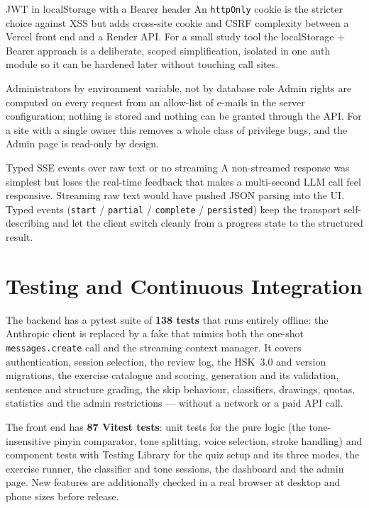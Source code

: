 \documentclass[11pt,a4paper]{article}
\begin{document}
\begin{decision}{JWT in localStorage with a Bearer header}
An \texttt{httpOnly} cookie is the stricter choice against XSS but adds
cross-site cookie and CSRF complexity between a Vercel front end and a Render
API. For a small study tool the localStorage + Bearer approach is a
deliberate, scoped simplification, isolated in one auth module so it can be
hardened later without touching call sites.
\end{decision}

\begin{decision}{Administrators by environment variable, not by database role}
Admin rights are computed on every request from an allow-list of e-mails in the
server configuration; nothing is stored and nothing can be granted through the
API. For a site with a single owner this removes a whole class of privilege
bugs, and the Admin page is read-only by design.
\end{decision}

\begin{decision}{Typed SSE events over raw text or no streaming}
A non-streamed response was simplest but loses the real-time feedback that
makes a multi-second LLM call feel responsive. Streaming raw text would have
pushed JSON parsing into the UI. Typed events (\texttt{start} /
\texttt{partial} / \texttt{complete} / \texttt{persisted}) keep the transport
self-describing and let the client switch cleanly from a progress state to the
structured result.
\end{decision}

\section{Testing and Continuous Integration}

The backend has a pytest suite of \textbf{138 tests} that runs entirely
offline: the Anthropic client is replaced by a fake that mimics both the
one-shot \texttt{messages.create} call and the streaming context manager. It
covers authentication, session selection, the review log, the HSK~3.0 and
version migrations, the exercise catalogue and scoring, generation and its
validation, sentence and structure grading, the skip behaviour, classifiers,
drawings, quotas, statistics and the admin restrictions --- without a network
or a paid API call.

The front end has \textbf{87 Vitest tests}: unit tests for the pure logic (the
tone-insensitive pinyin comparator, tone splitting, voice selection, stroke
handling) and component tests with Testing Library for the quiz setup and its
three modes, the exercise runner, the classifier and tone sessions, the
dashboard and the admin page. New features are additionally checked in a real
browser at desktop and phone sizes before release.
\end{document}
